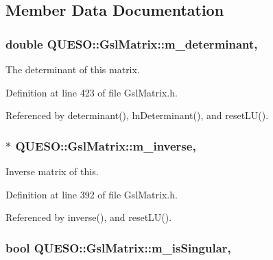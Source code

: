 \subsection{Member Data Documentation}
\hypertarget{class_q_u_e_s_o_1_1_gsl_matrix_a8be32859eb361fe9865d6df3a31aa579}{
\subsubsection[{m\-\_\-determinant}]{\setlength{\rightskip}{0pt plus 5cm}double Q\-U\-E\-S\-O\-::\-Gsl\-Matrix\-::m\-\_\-determinant\hspace{0.3cm}{\ttfamily [mutable]}, {\ttfamily [private]}}}\label{class_q_u_e_s_o_1_1_gsl_matrix_a8be32859eb361fe9865d6df3a31aa579}


The determinant of {\ttfamily this} matrix. 



Definition at line 423 of file Gsl\-Matrix.\-h.



Referenced by determinant(), ln\-Determinant(), and reset\-L\-U().

\hypertarget{class_q_u_e_s_o_1_1_gsl_matrix_a153dc687fc0ce5f5ff1a5600df6ba914}{
\subsubsection[{m\-\_\-inverse}]{$\ast$ Q\-U\-E\-S\-O\-::\-Gsl\-Matrix\-::m\-\_\-inverse\hspace{0.3cm}{\ttfamily [mutable]}, {\ttfamily [private]}}}\label{class_q_u_e_s_o_1_1_gsl_matrix_a153dc687fc0ce5f5ff1a5600df6ba914}


Inverse matrix of {\ttfamily this}. 



Definition at line 392 of file Gsl\-Matrix.\-h.



Referenced by inverse(), and reset\-L\-U().

\hypertarget{class_q_u_e_s_o_1_1_gsl_matrix_aa83274d327bb4e668bdeec51e2466c4e}{
\subsubsection[{m\-\_\-is\-Singular}]{\setlength{\rightskip}{0pt plus 5cm}bool Q\-U\-E\-S\-O\-::\-Gsl\-Matrix\-::m\-\_\-is\-Singular\hspace{0.3cm}{\ttfamily [mutable]}, {\ttfamily [private]}}}\label{class_q_u_e_s_o_1_1_gsl_matrix_aa83274d327bb4e668bdeec51e2466c4e}


